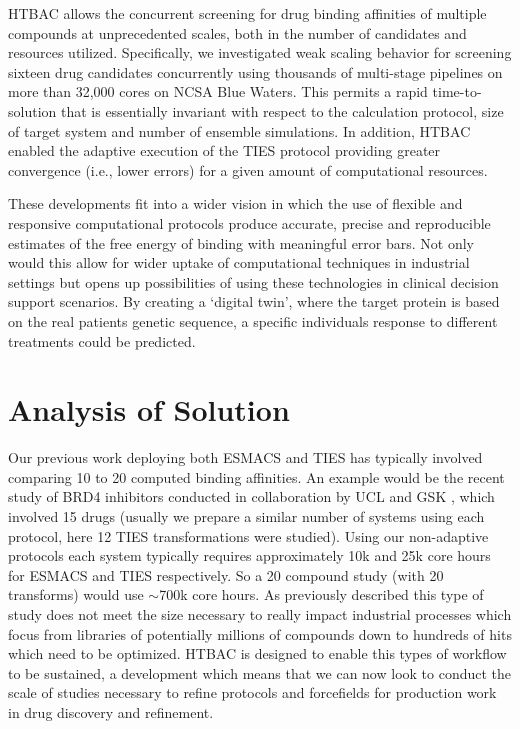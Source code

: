 \documentclass[conference]{IEEEtran}
\begin{document}
HTBAC allows the concurrent screening
for drug binding affinities of multiple compounds at unprecedented scales,
both in the number of candidates and resources utilized. Specifically, we
investigated weak scaling behavior for screening sixteen drug candidates
concurrently using thousands of multi-stage pipelines on more than 32,000
cores on NCSA Blue Waters. This permits a rapid time-to-solution that is
essentially invariant with respect to the calculation protocol,
size of target system and number of ensemble simulations. In addition,
HTBAC enabled the adaptive execution of the TIES protocol
providing greater convergence (i.e., lower errors) for a given amount of
computational resources.

These developments fit into a wider vision in which the use of
flexible and responsive computational protocols produce accurate,
precise and reproducible estimates of the free energy of binding with
meaningful error bars. Not only would this allow for wider uptake of
computational techniques in industrial settings but opens up possibilities
of using these technologies in clinical decision support scenarios. By creating
a `digital twin', where the target protein is based on the real patients
genetic sequence, a specific individuals response to different
treatments could be predicted.


\section{Analysis of Solution}\label{sec:analysis}

Our previous work deploying both ESMACS and TIES has typically involved comparing 10 to 20 computed
binding affinities.
An example would be the recent study of BRD4 inhibitors conducted in collaboration by UCL and GSK \cite{Wan2017brd4}, which involved 15 drugs (usually we prepare a similar number of systems using each protocol, here 12 TIES transformations were studied).
Using our non-adaptive protocols each system typically requires approximately 10k and 25k core hours for ESMACS and TIES respectively.
So a 20 compound study (with 20 transforms) would use $\sim$700k core hours.
As previously described this type of study does not meet the size necessary to really impact industrial processes which focus from libraries of potentially millions of compounds down to hundreds of hits which need to be optimized.
HTBAC is designed to enable this types of workflow to be sustained, a development which means that we can now look to conduct the scale of studies necessary to refine protocols and forcefields for production work in drug discovery and refinement.
\end{document}
